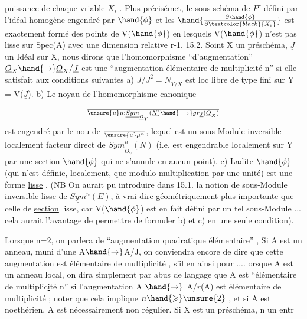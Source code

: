 
puissance de chaque vriable $X_i$ . Plus précisémet, le sous-schéma
de $P^r$ défini par l'idéal homogène engendré par  $\hand{\phi}$ et les $\hand{\frac{\partial\hand{\phi}}{\partial\textcolor{black}{X_i}}}$ est
exactement formé des points de V($\hand{\phi}$) en lesquels V($\hand{\phi}$) n'est pas lisse sur
Spec(A) avec une dimension relative r-1.
15.2. Soint X un préschéma, $\underline{J}$ un Idéal   sur X, nous dirons que
l'homomorphisme ``d'augmentation'' $\underline{O}_X \hand{\to} \underline{O}_X/\underline{J}$ est une ``augmentation
élémentaire de multiplicité n'' si elle satisfait aux conditions suivantes
a) $\underline{J}/\underline{J}^2 = \underline{N}_{Y/X}$ est loc libre de type fini sur Y = V($\underline{J}$).
b) Le noyau de l'homomorphisme canonique
\[ \over{\unsure{u}}{\mu} : \underline{Sym}_{\underline{O}_Y}(\underline{N}) \hand{\longrightarrow} gr_{\underline{J}}(\underline{O}_X) \]
est engendré par le nou  de $\over{\unsure{u}}{\mu}^n$, lequel est un sous-Module inversible
localement facteur direct de $\underline{Sym}^n_{\underline{O}_Y}(\underline{N})$ (i.e. est engendrable localement
sur Y par une section $\hand{\phi}$ qui ne s'annule en aucun point).
c) Ladite $\hand{\phi}$ (qui n'est définie, localement, que modulo multiplication
par une unité) est une forme \uline{lisse} . (NB On aurait pu introduire dans
\margin{\textbar}15.1. la notion de sous-Module inversible lisse de $\underline{Sym}^n(E)$, à vrai dire
géométriquement plus importante que celle de \uline{section} lisse, car V($\hand{\phi}$) est
en fait défini par un tel sous-Module ...\xout{\unsure{;}} cela aurait l'avantage de
permettre de formuler b) et c) en une seule condition).

Lorsque n=2, on parlera de ``augmentation  quadratique élémentaire'' ,
Si A est un anneau,  muni d'une  A$\hand{\to}$A/J,
on conviendra encore de dire que cette augmentation est élémentaire de
multiplicité  , s'il en  ainsi pour .... orsque A est un anneau
local, on dira simplement par abus de langage que A est ``élémentaire de
multiplic\uline{i}té n'' si l'augmentation A $\hand{\to}$ A/$\underline{r}$(A) est élémentaire de
multiplicité ; noter que cela implique $n \hand{\geqslant} \unsure{2}$ , et si A est noethérien,
A est nécessairement non régulier. Si X est un préschéma, n un entr


